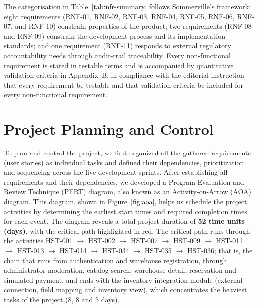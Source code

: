 \documentclass[11pt,a4paper,oneside]{report}
\begin{document}
The categorisation in Table~\ref{tab:nfr-summary} follows Sommerville's framework: eight requirements (RNF-01, RNF-02, RNF-03, RNF-04, RNF-05, RNF-06, RNF-07, and RNF-10) constrain properties of the product; two requirements (RNF-08 and RNF-09) constrain the development process and its implementation standards; and one requirement (RNF-11) responds to external regulatory accountability needs through audit-trail traceability. Every non-functional requirement is stated in testable terms and is accompanied by quantitative validation criteria in Appendix~B, in compliance with the editorial instruction that every requirement be testable and that validation criteria be included for every non-functional requirement.

%


\chapter{Project Planning and Control}

To plan and control the project, we first organized all the gathered requirements
(user stories) as individual tasks and defined their dependencies, prioritization
and sequencing across the five development sprints. After establishing all
requirements and their dependencies, we developed a Program Evaluation and Review
Technique (PERT) diagram, also known as an Activity-on-Arrow (AOA) diagram. This
diagram, shown in Figure~\ref{fig:aoa}, helps us schedule the project activities by
determining the earliest start times and required completion times for each event.
The diagram reveals a total project
duration of \textbf{52 time units (days)}, with the critical path highlighted in
red. The critical path runs through the activities
HST-001 $\rightarrow$ HST-002 $\rightarrow$ HST-007 $\rightarrow$ HST-009
$\rightarrow$ HST-011 $\rightarrow$ HST-013 $\rightarrow$ HST-014 $\rightarrow$
HST-034 $\rightarrow$ HST-035 $\rightarrow$ HST-036; that is, the chain that runs
from authentication and warehouse registration, through administrator moderation,
catalog search, warehouse detail, reservation and simulated payment, and ends with
the inventory-integration module (external connection, field mapping and inventory
view), which concentrates the heaviest tasks of the project (8, 8 and 5 days).
\end{document}

